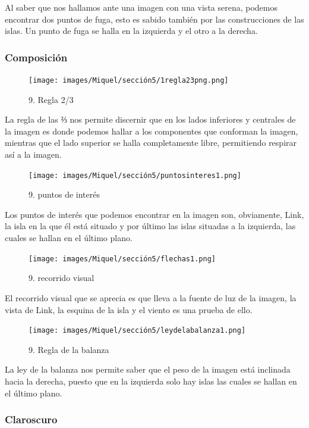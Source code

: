 \documentclass[12pt]{article}
\begin{document}
    Al saber que nos hallamos ante una imagen con una vista serena, podemos encontrar dos puntos de fuga, esto es sabido también por las construcciones  de las islas. Un punto de fuga se halla en la izquierda y el otro a la derecha.


        \subsubsection{Composición}
    \begin{figure}[H]
      \centering
      \texttt{[image: images/Miquel/sección5/1regla23png.png]}
      \caption{\small 9. Regla 2/3}
    \end{figure}
    
    La regla de las ⅔ nos permite discernir que en los lados inferiores y centrales de la imagen es donde podemos hallar a los componentes que conforman la imagen, mientras que el lado superior se halla completamente libre, permitiendo respirar así a la imagen.

    \begin{figure}[H]
      \centering
      \texttt{[image: images/Miquel/sección5/puntosinteres1.png]}
      \caption{\small 9. puntos de interés}
    \end{figure}

    Los puntos de interés que podemos encontrar en la imagen son, obviamente, Link, la isla en la que él está situado y por último las islas situadas a la izquierda, las cuales se hallan en el último plano.

    \begin{figure}[H]
      \centering
      \texttt{[image: images/Miquel/sección5/flechas1.png]}
      \caption{\small 9. recorrido visual}
    \end{figure}

     El recorrido visual que se aprecia es que lleva a la fuente de luz de la imagen, la vista de Link, la esquina de la isla y el viento es una prueba de ello.

    \begin{figure}[H]
      \centering
      \texttt{[image: images/Miquel/sección5/leydelabalanza1.png]}
      \caption{\small 9. Regla de la balanza}
    \end{figure}

    La ley de la balanza nos permite saber que el peso de la imagen está inclinada hacia la derecha, puesto que en la izquierda solo hay islas las cuales se hallan en el último plano.

        \subsubsection{Claroscuro}
\end{document}
